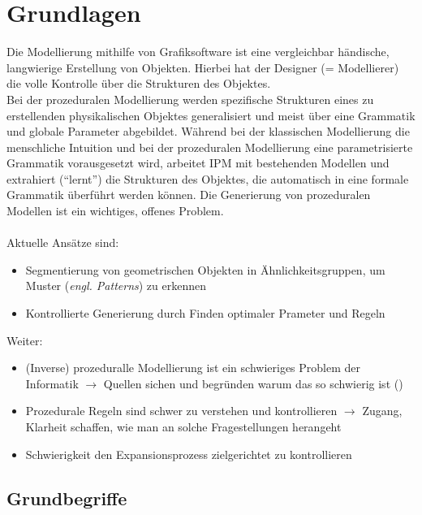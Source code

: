
\chapter{Grundlagen}

Die Modellierung mithilfe von Grafiksoftware ist eine vergleichbar händische, langwierige Erstellung von
Objekten.
Hierbei hat der Designer (= Modellierer) die volle Kontrolle über die Strukturen des Objektes.\\
Bei der prozeduralen Modellierung werden spezifische Strukturen eines zu erstellenden physikalischen Objektes
generalisiert und meist über eine Grammatik und globale Parameter abgebildet.
Während bei der klassischen Modellierung die menschliche Intuition und bei der prozeduralen Modellierung eine
parametrisierte Grammatik vorausgesetzt wird, arbeitet IPM mit bestehenden Modellen und extrahiert ("`lernt"')
die Strukturen des Objektes, die automatisch in eine formale Grammatik überführt werden können.
Die Generierung von prozeduralen Modellen ist ein wichtiges, offenes Problem.
\\~\\
Aktuelle Ansätze sind:
\begin{itemize}
    \item Segmentierung von geometrischen Objekten in Ähnlichkeitsgruppen, um Muster (\textit{engl. Patterns}) zu
    erkennen
    \item Kontrollierte Generierung durch Finden optimaler Prameter und Regeln
\end{itemize}

Weiter:
\begin{itemize}
    \item (Inverse) prozeduralle Modellierung ist ein schwieriges Problem der Informatik $\rightarrow$ Quellen sichen und
    begründen warum das so schwierig ist (\cite{aliaga_2016})
    \item Prozedurale Regeln sind schwer zu verstehen und kontrollieren $\rightarrow$ Zugang, Klarheit schaffen, wie man an
    solche Fragestellungen herangeht
    \item Schwierigkeit den Expansionsprozess zielgerichtet zu kontrollieren~\cite{prusinkiewicz_1990}
\end{itemize}

\section{Grundbegriffe}

